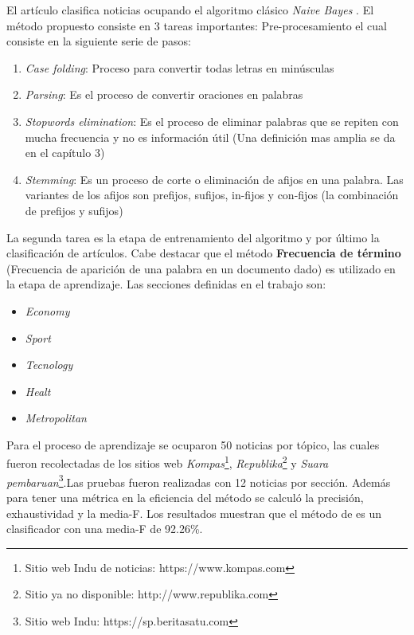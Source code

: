 El artículo clasifica noticias ocupando el algoritmo clásico \textit{Naive Bayes} \citep{CD7}. El método propuesto consiste en 3 tareas importantes: Pre-procesamiento el cual consiste en la siguiente serie de pasos: 
 
\begin{enumerate}

	\item \textit{Case folding}: Proceso para convertir todas letras en minúsculas
	\item \textit{Parsing}: Es el proceso de convertir oraciones en palabras
	\item \textit{Stopwords elimination}: Es el proceso de eliminar palabras que se repiten con mucha frecuencia y no es información útil (Una definición mas amplia se da en el capítulo 3)
	\item \textit{Stemming}: Es un proceso de corte o eliminación de afijos en una palabra. Las variantes de los afijos son prefijos, sufijos, in-fijos y con-fijos (la combinación de prefijos y sufijos)

\end{enumerate}	

La segunda tarea es la etapa de entrenamiento del algoritmo y por último la clasificación de artículos. Cabe destacar que el método \textbf{Frecuencia de término} (Frecuencia de aparición de una palabra en un documento dado) es utilizado en la etapa de aprendizaje. Las secciones definidas en el trabajo son: 

\begin{itemize}

	\item \textit{Economy}
	\item \textit{Sport}
	\item \textit{Tecnology}
	\item \textit{Healt} 
	\item \textit{Metropolitan}

\end{itemize}

Para el proceso de aprendizaje se ocuparon 50 noticias por tópico, las cuales fueron recolectadas de los sitios web \textit{Kompas}\footnote{Sitio web Indu de noticias: https://www.kompas.com}, \textit{Republika}\footnote{Sitio ya no disponible: http://www.republika.com} y \textit{Suara pembaruan}\footnote{Sitio web Indu: https://sp.beritasatu.com}.Las pruebas fueron realizadas con 12 noticias por sección. Además para tener una métrica en la eficiencia del método se calculó la precisión, exhaustividad y la media-F. Los resultados muestran que el método de  es un clasificador con una media-F de 92.26\%.\\ 

